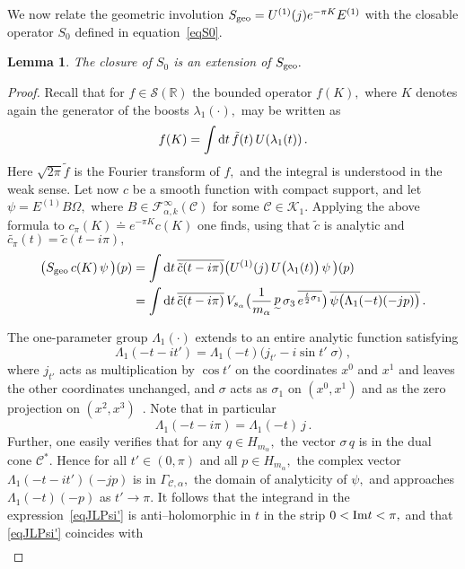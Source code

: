 \documentclass[a4paper,reqno,11pt]{amsart}
\theoremstyle{plain}
\newtheorem{Lem}[Thm]{Lemma}
\theoremstyle{definition}
\numberwithin{equation}{section}
\newcommand{\Bb}{\mathbb{R}}
\newcommand{\F}{{\mathcal F}}
\newcommand{\calC}{{\mathcal C}}
\newcommand{\calK}{{\mathcal K}}
\newcommand{\calS}{{\mathcal S}}
\renewcommand{\d}{{\rm d}}
\newcommand{\utilde}[1]{\mathop{#1}\limits_{\widetilde{\phantom{\textstyle
 #1}}}}
\newcommand{\im}{{\rm Im }}
\renewcommand{\sec}{\alpha}
\newcommand{\Sgeoe}{S_{\rm geo}}  %
\newcommand{\msec}{{m_{\sec}}}
\newcommand{\ssec}{{s_{\sec}}}
\newcommand{\Uej}{U^{(1)}(j)}
\newcommand{\Ee}{E^{(1)}}
\newcommand{\cone}{\calC}   %
\begin{document}
We now relate the geometric involution $\Sgeoe=\Uej e^{-\pi K}\Ee$
with the closable operator $S_0$ defined in equation~\eqref{eqS0}. 
\begin{Lem} \label{LemSgeoStom} 
The closure of  $S_0$ is an extension of $\Sgeoe.$ 
\end{Lem}
\begin{proof}
Recall that for $f\in\calS(\Bb)$ the bounded operator $f(K),$ where
$K$ denotes again the generator of the boosts $\lambda_1(\cdot),$  
may be written as 
\[ f(K)=\int\d t\,\tilde{f}(t)\,U(\lambda_1(t)) \,. 
\] 
Here $\sqrt{2\pi}\tilde{f}$ is the Fourier transform of $f,$ and the integral is
understood in the weak sense.  
Let now $c$ be a smooth function with compact support, and let 
$\psi=\Ee B\Omega,$ where  $B\in\F_{\sec,k}^\infty(\cone)$
for some $\cone\in\calK_1.$ 
Applying the above formula to $c_\pi(K)\doteq e^{-\pi  K}c(K)$ 
one finds, using that $\tilde{c}$ is analytic and 
$\widetilde{c_\pi}(t)=\tilde{c}(t-i\pi),$ 
\begin{align}
\big(\Sgeoe\, c(K)\, \psi \,\big)(p)&= 
\int\d t\,\overline{\tilde{c}(t-i\pi)}
\big(\Uej \,U\big(\lambda_1(t)\big)\,\psi \,\big)(p) \label{eqJLPsi} \\ 
&=\int\d t\,\overline{\tilde{c}(t-i\pi)}\, 
V_\ssec\big(\frac{1}{\msec}\utilde{p} 
\sigma_3\,\overline{e^{\frac{t}{2}\sigma_1}}\big)\, 
 \overline{\psi\big(\Lambda_1(-t)(-jp)\big)}\,. \label{eqJLPsi'}
\end{align}
The one-parameter group $\Lambda_1(\cdot)$ extends to an
entire analytic function satisfying 
\[ \Lambda_1(-t-it') = \Lambda_1(-t)\big(j_{t'}-i \sin t'\; \sigma \big)\;,
\]
where $j_{t'}$ 
acts as multiplication by $\cos t'$ on the coordinates $x^0$ and
$x^1$ and leaves the other coordinates unchanged, and $\sigma$ acts as
$\sigma_1$ on $(x^0,x^1)$ and as the zero projection on
$(x^2,x^3)$~\cite{H96}. 
Note that in particular 
\begin{equation*} 
\Lambda_1(-t-i\pi)= \Lambda_1(-t) \,j\,.
\end{equation*}
Further, one easily verifies that for any $q\in H_\msec,$ the vector 
$\sigma\,q$ is in the dual cone $\cone^*.$ Hence for all $t'\in (0,\pi)$ 
and all $p\in H_\msec,$ the complex vector 
$\Lambda_1(-t-it')(-j p)$ is in $\Gamma_{\cone,\sec},$ the domain of
analyticity of $\psi,$ and approaches
$\Lambda_1(-t)(-p)$ as $t'\rightarrow\pi.$ 
It follows that the integrand in the expression~\eqref{eqJLPsi'} is
anti--holomorphic in $t$ in the strip $0<\im t<\pi,$ 
and that \eqref{eqJLPsi'} coincides with 
\begin{align} \nonumber 

\end{align}
\end{proof}
\end{document}
